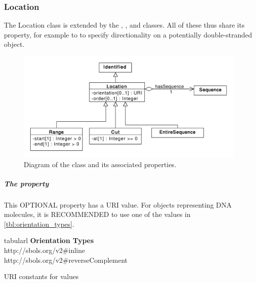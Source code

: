 



\subsubsection{Location}
\label{sec:Location}
The Location class is extended by the , , and  classes.  All of these thus share its  property, for example to to specify directionality on a potentially double-stranded  object.

\begin{figure}[ht]
\begin{center}
\includegraphics[scale=0.6]{uml/location}
\caption[]{Diagram of the  class and its associated properties.}
\label{uml:location}
\end{center}
\end{figure}

\subparagraph{The  property}
\label{sec:orientation}
This OPTIONAL property has a URI value. For  objects representing DNA molecules, it is RECOMMENDED to use one of the values in \ref{tbl:orientation_types}. 

\begin{table}[ht]
  \begin{edtable}{tabular}{l}
    \toprule
    \textbf{Orientation Types}  \\
    \midrule
    http://sbols.org/v2\#inline\\
    http://sbols.org/v2\#reverseComplement\\
    \bottomrule
  \end{edtable}
  \caption{URI constants for  values}
  \label{tbl:orientation_types}
\end{table}


